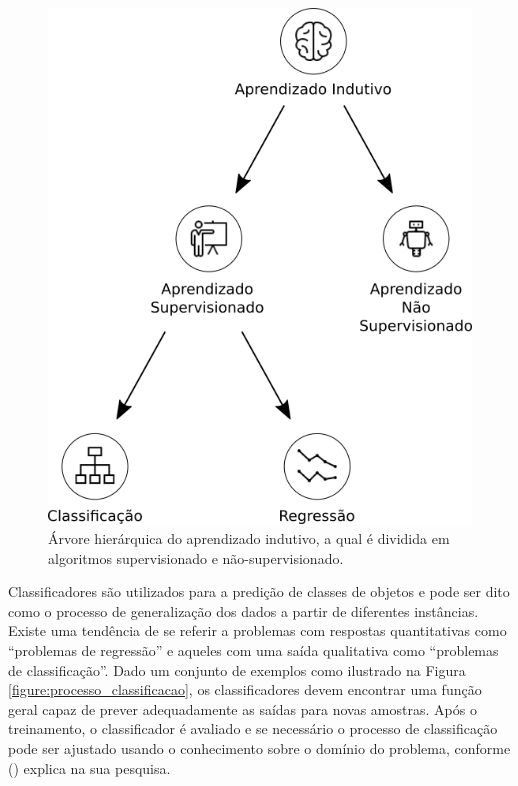 \begin{figure}[H]
\begin{center}
    \includegraphics[scale=0.40]{images/aprendizado_indutivo.png}
\end{center}
\caption{Árvore hierárquica do aprendizado indutivo, a qual é dividida em 
algoritmos supervisionado e não-supervisionado.}
\label{figure:aprendizado_indutivo}
\end{figure}

Classificadores são utilizados para a predição de classes de objetos e pode ser 
dito como o processo de generalização dos dados a partir de diferentes 
instâncias. Existe uma tendência de se referir a problemas com respostas 
quantitativas como ``problemas de regressão'' e aqueles com uma saída 
qualitativa como ``problemas de classificação''. Dado um conjunto de exemplos 
como ilustrado na Figura \ref{figure:processo_classificacao}, os 
classificadores devem encontrar uma função geral capaz de prever adequadamente 
as saídas para novas amostras. Após o treinamento, o classificador é avaliado e 
se necessário o processo de classificação pode ser ajustado usando o 
conhecimento sobre o domínio do problema, conforme 
 (\citeyear{porthos_motta:2016}) explica 
na sua pesquisa.


